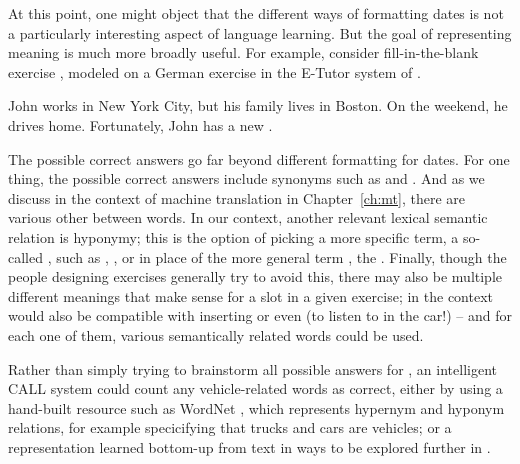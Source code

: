 At this point, one might object that the different ways of formatting dates is not a particularly interesting aspect of language learning.  But the goal of representing meaning is much more broadly useful.  For example, consider fill-in-the-blank exercise , modeled on a German exercise in the E-Tutor system of \citet{Heift:2010}.

\ea  \label{ex:fib-synonym} John works in New York City, but his
  family lives in Boston. On the weekend, he drives home. Fortunately,
  John has a new \uline{\hspace{2.5cm}}.
\z 

The possible correct answers go far beyond different formatting for dates.  For one thing, the possible correct answers include synonyms such as
 and . And as we discuss in the context
of machine translation in Chapter~\ref{ch:mt}, there are various other  between words.  In our context, another relevant
lexical semantic relation is hyponymy; this is the option of picking a
more specific term, a so-called , such as , , or  in place of the
more general term , the .  Finally, though the people designing exercises generally try to avoid this,
there may also be multiple different meanings that make sense for a
slot in a given exercise; in  the context
would also be compatible with inserting  or even  (to listen to in the car!) -- and for each one of them, various semantically related words could be used.

Rather than simply trying to brainstorm all possible answers for  , an intelligent CALL system could count any vehicle-related words as correct, either by using a hand-built resource such as WordNet \citep{fellbaum:98}, which represents hypernym and hyponym relations, for example specicifying that trucks and cars are vehicles; or a representation learned bottom-up from text in ways to be explored further in . 




